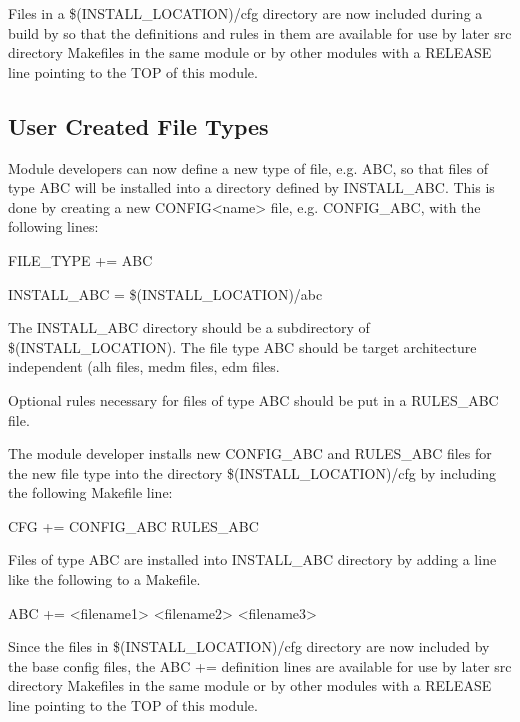 Files in a \$(INSTALL\_LOCATION)/cfg directory are now included during a build by so that the definitions and rules in 
them are available for use by later src directory Makefiles in the same module or by other modules with a RELEASE line 
pointing to the TOP of this module.

\subsection{User Created File Types}

Module developers can now define a new type of file, e.g. ABC, so that files of type ABC will be installed into a directory 
defined by INSTALL\_ABC. This is done by creating a new CONFIG\textless{}name\textgreater{} file, e.g. CONFIG\_ABC, with the 
following lines:

\begin{description}\item {}FILE\_TYPE += ABC

\item INSTALL\_ABC = \$(INSTALL\_LOCATION)/abc

\end{description}The INSTALL\_ABC directory should be a subdirectory of \$(INSTALL\_LOCATION). The file type ABC should be 
target architecture independent (alh files, medm files, edm files.

Optional rules necessary for files of type ABC should be put in a RULES\_ABC file.

The module developer installs new CONFIG\_ABC and RULES\_ABC files for the new file type into the directory 
\$(INSTALL\_LOCATION)/cfg by including the following Makefile line:

\begin{description}\item       {}CFG += CONFIG\_ABC RULES\_ABC

\end{description}Files of type ABC are installed into INSTALL\_ABC directory by adding a line like the following to a Makefile.

\begin{description}\item       ABC += \textless{}filename1\textgreater{} \textless{}filename2\textgreater{} \textless{}filename3\textgreater{}

\end{description}Since the files in \$(INSTALL\_LOCATION)/cfg directory are now included by the base config files, the ABC += 
definition lines are available for use by later src directory Makefiles in the same module or by other modules with a 
RELEASE line pointing to the TOP of this module.

